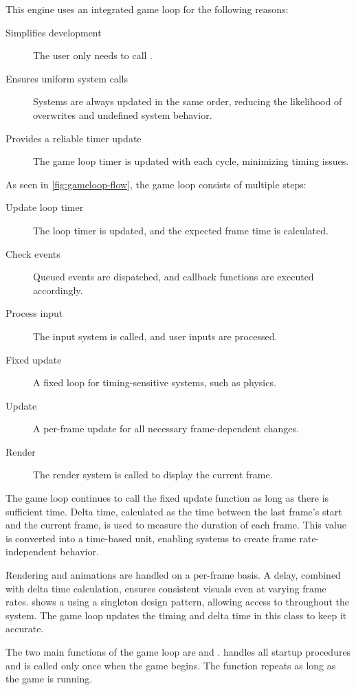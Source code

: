 \documentclass{projdoc}
\begin{document}
This engine uses an integrated game loop for the following reasons:\noparbreak
\begin{description}
	\item[Simplifies development] The user only needs to call .
	\item[Ensures uniform system calls] Systems are always updated in the same order,
		reducing the likelihood of overwrites and undefined system behavior.
	\item[Provides a reliable timer update] The game loop timer is updated with each
		cycle, minimizing timing issues.
\end{description}

As seen in \cref{fig:gameloop-flow}, the game loop consists of multiple
steps:\noparbreak
\begin{description}
	\item[Update loop timer] The loop timer is updated, and the expected frame time is
		calculated.
	\item[Check events] Queued events are dispatched, and callback functions are
		executed accordingly.
	\item[Process input] The input system is called, and user inputs are processed.
	\item[Fixed update] A fixed loop for timing-sensitive systems, such as physics.
	\item[Update] A per-frame update for all necessary frame-dependent changes.
	\item[Render] The render system is called to display the current frame.
\end{description}

The game loop continues to call the fixed update function as long as there is
sufficient time. Delta time, calculated as the time between the last frame’s start
and the current frame, is used to measure the duration of each frame. This value is
converted into a time-based unit, enabling systems to create frame rate-independent
behavior.

Rendering and animations are handled on a per-frame basis. A delay, combined with
delta time calculation, ensures consistent visuals even at varying frame rates.
 shows a  using a singleton design
pattern, allowing access to  throughout the system. The game
loop updates the timing and delta time in this class to keep it accurate.

The two main functions of the game loop are  and
.  handles all startup procedures and is
called only once when the game begins. The  function repeats as
long as the game is running.
\end{document}
